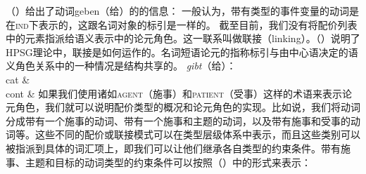 （）给出了动词geben（给）的\contvc 的信息：
\ea
\label{mrs-geben}
\z
一般认为，带有类型的事件变量的动词是在\textsc{ind}下表示的，这跟名词对象的标引是一样的。 
截至目前，我们没有将配价列表中的元素指派给语义表示中的论元角色。这一联系叫做联接（linking）。（）说明了HPSG理论中，联接是如何运作的。名词短语论元的指称标引与由中心语决定的语义角色关系中的一种情况是结构共享的。
\eas
\label{le-geben}
\emph{gibt}（给）：\\
\ms
{ cat &  \\
  cont &  
}
\zs
如果我们使用诸如\textsc{agent}（施事）和\textsc{patient}（受事）这样的术语来表示论元角色，我们就可以说明配价类型的概况和论元角色的实现。比如说，我们将动词分成带有一个施事的动词、带有一个施事和主题的动词，以及带有施事和受事的动词等。这些不同的配价或联接模式可以在类型层级体系中表示，而且这些类别可以被指派到具体的词汇项上，即我们可以让他们继承各自类型的约束条件。带有施事、主题和目标的动词类型的约束条件可以按照（）中的形式来表示：
